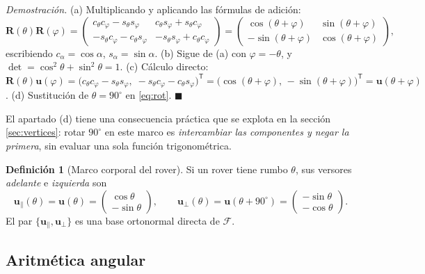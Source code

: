 \documentclass[11pt,a4paper]{article}
\theoremstyle{definition}
\newtheorem{definicion}[teorema]{Definición}
\newenvironment{demo}{\par\noindent\textit{Demostración.}\;}{\hfill$\blacksquare$\par\medskip}
\newcommand{\Rot}{\mathbf{R}}
\newcommand{\uu}{\mathbf{u}}
\newcommand{\grados}{^{\circ}}
\begin{document}
\begin{demo}
(a) Multiplicando y aplicando las fórmulas de adición:
\[
\Rot(\theta)\Rot(\varphi)=
\begin{pmatrix}
c_\theta c_\varphi - s_\theta s_\varphi & c_\theta s_\varphi + s_\theta c_\varphi\\
-s_\theta c_\varphi - c_\theta s_\varphi & -s_\theta s_\varphi + c_\theta c_\varphi
\end{pmatrix}
=
\begin{pmatrix}
\cos(\theta+\varphi) & \sin(\theta+\varphi)\\
-\sin(\theta+\varphi) & \cos(\theta+\varphi)
\end{pmatrix},
\]
escribiendo $c_\alpha=\cos\alpha$, $s_\alpha=\sin\alpha$.
(b) Sigue de (a) con $\varphi=-\theta$, y $\det = \cos^2\theta+\sin^2\theta = 1$.
(c) Cálculo directo:
$\Rot(\theta)\uu(\varphi) = \big(c_\theta c_\varphi - s_\theta s_\varphi,\;
-s_\theta c_\varphi - c_\theta s_\varphi\big)^{\mathsf T}
= \big(\cos(\theta+\varphi),\,-\sin(\theta+\varphi)\big)^{\mathsf T} = \uu(\theta+\varphi)$.
(d) Sustitución de $\theta = 90\grados$ en \eqref{eq:rot}.
\end{demo}

El apartado (d) tiene una consecuencia práctica que se explota en la
sección \ref{sec:vertices}: rotar $90\grados$ en este marco es \emph{intercambiar las
componentes y negar la primera}, sin evaluar una sola función trigonométrica.

\begin{definicion}[Marco corporal del rover]
Si un rover tiene rumbo $\theta$, sus versores \emph{adelante} e \emph{izquierda} son
\begin{equation}
  \uu_{\parallel}(\theta) = \uu(\theta) = \begin{pmatrix}\cos\theta\\ -\sin\theta\end{pmatrix},
  \qquad
  \uu_{\perp}(\theta) = \uu(\theta + 90\grados) = \begin{pmatrix}-\sin\theta\\ -\cos\theta\end{pmatrix}.
  \label{eq:marco-rover}
\end{equation}
El par $\{\uu_\parallel, \uu_\perp\}$ es una base ortonormal directa de $\mathcal F$.
\end{definicion}

\subsection{Aritmética angular}
\end{document}
